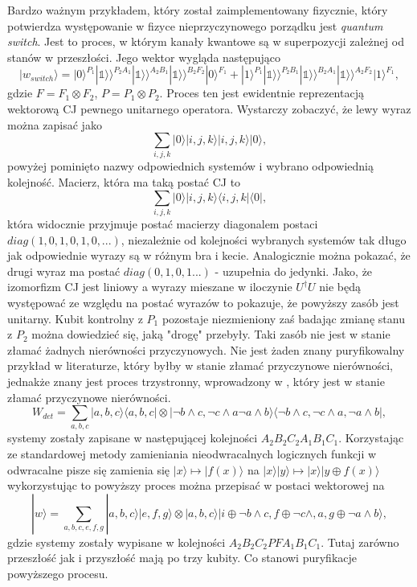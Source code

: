 \documentclass[10pt]{article} %
\newcommand{\Ket}[1]{|#1\rangle}
\newcommand{\Bra}[1]{\langle#1|}
\newcommand{\KKet}[1]{|#1\rangle\rangle}
\newcommand{\I}{\mathbb{1}}
\begin{document}
Bardzo ważnym przykładem, który został zaimplementowany fizycznie, który potwierdza występowanie w fizyce nieprzyczynowego porządku jest \textit{quantum switch}. Jest to proces, w którym kanały kwantowe są w superpozycji zależnej od stanów w przeszłości. Jego wektor wygląda następująco
\begin{equation}
\Ket{w_{switch}} = \Ket{0}^{P_1}\KKet{\I}^{P_2A_1}\KKet{\I}^{A_2B_1}\KKet{\I}^{B_2F_2}\Ket{0}^{F_1}+\Ket{1}^{P_1}\KKet{\I}^{P_2B_1}\KKet{\I}^{B_2A_1}\KKet{\I}^{A_2F_2}\Ket{1}^{F_1},
\end{equation} gdzie $F = F_1 \otimes F_2$, $P = P_1 \otimes P_2$. Proces ten jest ewidentnie reprezentacją wektorową CJ pewnego unitarnego operatora. Wystarczy zobaczyć, że lewy wyraz można zapisać jako
\begin{equation}
\sum_{i,j,k} \Ket{0} \Ket{i,j,k}\Ket{i,j,k}\Ket{0},
\end{equation} powyżej pominięto nazwy odpowiednich systemów i wybrano odpowiednią kolejność.
Macierz, która ma taką postać CJ to
\begin{equation}
\sum_{i,j,k} \Ket{0} \Ket{i,j,k}\Bra{i,j,k}\Bra{0},
\end{equation} która widocznie przyjmuje postać macierzy diagonalem postaci $diag(1,0,1,0,1,0,...)$, niezależnie od kolejności wybranych systemów tak długo jak odpowiednie wyrazy są w różnym bra i kecie. Analogicznie można pokazać, że drugi wyraz ma postać $diag(0,1,0,1...)$ - uzupełnia do jedynki. Jako, że izomorfizm CJ jest liniowy a wyrazy mieszane w iloczynie $U^\dag U$ nie będą występować ze względu na postać wyrazów to pokazuje, że powyższy zasób jest unitarny. Kubit kontrolny z $P_1$ pozostaje niezmieniony zaś badając zmianę stanu z $P_2$ można dowiedzieć się, jaką "drogę" przebyły. Taki zasób nie jest w stanie złamać żadnych nierówności przyczynowych.
Nie jest żaden znany puryfikowalny przykład w literaturze, który byłby w stanie złamać przyczynowe nierówności, jednakże znany jest proces trzystronny, wprowadzony w \cite{logic}, który jest w stanie złamać przyczynowe nierówności. 
\begin{equation}
W_{det} = \sum_{a,b,c} \Ket{a,b,c}\Bra{a,b,c} \otimes \Ket{\neg b \land c, \neg c\land a \neg a\land b} \Bra{\neg b \land c, \neg c\land a ,\neg a\land b},
\end{equation} systemy zostały zapisane w następującej kolejności $A_2B_2C_2A_1B_1C_1$. Korzystając ze standardowej metody zamieniania nieodwracalnych logicznych funkcji w odwracalne pisze się zamienia się
$\Ket{x} \mapsto \Ket{f(x)}$ na $\Ket{x}\Ket{y} \mapsto \Ket{x}\Ket{y \oplus f(x)}$ wykorzystując to powyższy proces można przepisać w postaci wektorowej na
\begin{equation}
\Ket{w} = \sum_{a,b,c,e,f,g} \Ket{a,b,c}\Ket{e,f,g} \otimes \Ket{a,b,c}\Ket{i \oplus \neg b \land c,f \oplus \neg c\land, a , g\oplus \neg a\land b},
\end{equation} gdzie systemy zostały wypisane w kolejności $A_2B_2C_2PFA_1B_1C_1$. Tutaj zarówno przeszłość jak i przyszłość mają po trzy kubity. Co stanowi puryfikacje powyższego procesu.
\end{document}
